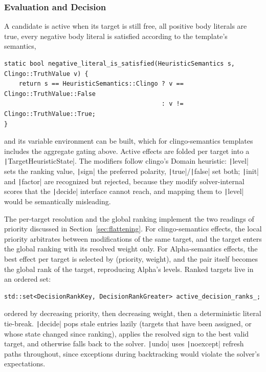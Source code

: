 \subsubsection{Evaluation and Decision}

A candidate is active when its target is still free, all positive body literals are true, every negative body literal is satisfied according to the template's semantics,

\begin{verbatim}
static bool negative_literal_is_satisfied(HeuristicSemantics s, Clingo::TruthValue v) {
    return s == HeuristicSemantics::Clingo ? v == Clingo::TruthValue::False
                                           : v != Clingo::TruthValue::True;
}
\end{verbatim}

and its variable environment can be built, which for clingo-semantics templates includes the aggregate gating above. Active effects are folded per target into a \texttt|TargetHeuristicState|. The modifiers follow clingo's Domain heuristic: \texttt|level| sets the ranking value, \texttt|sign| the preferred polarity, \texttt|true|/\texttt|false| set both; \texttt|init| and \texttt|factor| are recognized but rejected, because they modify solver-internal scores that the \texttt|decide| interface cannot reach, and mapping them to \texttt|level| would be semantically misleading.

The per-target resolution and the global ranking implement the two readings of priority discussed in Section~\ref{sec:flattening}. For clingo-semantics effects, the local priority arbitrates between modifications of the same target, and the target enters the global ranking with its resolved weight only. For Alpha-semantics effects, the best effect per target is selected by (priority, weight), and the pair itself becomes the global rank of the target, reproducing Alpha's levels. Ranked targets live in an ordered set:

\begin{verbatim}
std::set<DecisionRankKey, DecisionRankGreater> active_decision_ranks_;
\end{verbatim}

ordered by decreasing priority, then decreasing weight, then a deterministic literal tie-break. \texttt|decide| pops stale entries lazily (targets that have been assigned, or whose state changed since ranking), applies the resolved sign to the best valid target, and otherwise falls back to the solver. \texttt|undo| uses \texttt|noexcept| refresh paths throughout, since exceptions during backtracking would violate the solver's expectations.


